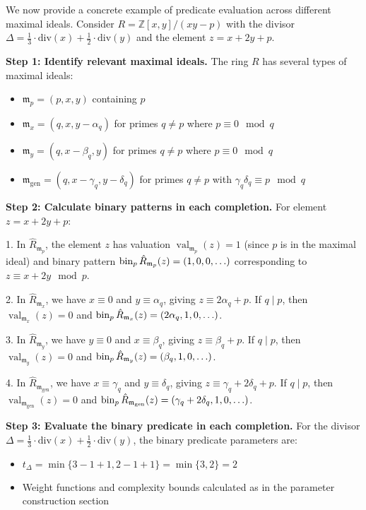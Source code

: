 \begin{example}\label{ex:predicate-across-ideals}
We now provide a concrete example of predicate evaluation across different maximal ideals. Consider $R = \mathbb{Z}[x, y]/(xy-p)$ with the divisor $\Delta = \frac{1}{3} \cdot \text{div}(x) + \frac{1}{2} \cdot \text{div}(y)$ and the element $z = x + 2y + p$.

\textbf{Step 1: Identify relevant maximal ideals.} The ring $R$ has several types of maximal ideals:
\begin{itemize}
    \item $\mathfrak{m}_p = (p, x, y)$ containing $p$
    \item $\mathfrak{m}_x = (q, x, y-\alpha_q)$ for primes $q \neq p$ where $p \equiv 0 \mod q$
    \item $\mathfrak{m}_y = (q, x-\beta_q, y)$ for primes $q \neq p$ where $p \equiv 0 \mod q$
    \item $\mathfrak{m}_{\text{gen}} = (q, x-\gamma_q, y-\delta_q)$ for primes $q \neq p$ with $\gamma_q\delta_q \equiv p \mod q$
\end{itemize}

\textbf{Step 2: Calculate binary patterns in each completion.} For element $z = x + 2y + p$:

1. In $\hat{R}_{\mathfrak{m}_p}$, the element $z$ has valuation $\operatorname{val}_{\mathfrak{m}_p}(z) = 1$ (since $p$ is in the maximal ideal) and binary pattern $\operatorname{bin}_p{\hat{R}_{\mathfrak{m}_p}}(z) = (1, 0, 0, \ldots)$ corresponding to $z \equiv x + 2y \mod p$.

2. In $\hat{R}_{\mathfrak{m}_x}$, we have $x \equiv 0$ and $y \equiv \alpha_q$, giving $z \equiv 2\alpha_q + p$. If $q \mid p$, then $\operatorname{val}_{\mathfrak{m}_x}(z) = 0$ and $\operatorname{bin}_p{\hat{R}_{\mathfrak{m}_x}}(z) = (2\alpha_q, 1, 0, \ldots)$.

3. In $\hat{R}_{\mathfrak{m}_y}$, we have $y \equiv 0$ and $x \equiv \beta_q$, giving $z \equiv \beta_q + p$. If $q \mid p$, then $\operatorname{val}_{\mathfrak{m}_y}(z) = 0$ and $\operatorname{bin}_p{\hat{R}_{\mathfrak{m}_y}}(z) = (\beta_q, 1, 0, \ldots)$.

4. In $\hat{R}_{\mathfrak{m}_{\text{gen}}}$, we have $x \equiv \gamma_q$ and $y \equiv \delta_q$, giving $z \equiv \gamma_q + 2\delta_q + p$. If $q \mid p$, then $\operatorname{val}_{\mathfrak{m}_{\text{gen}}}(z) = 0$ and $\operatorname{bin}_p{\hat{R}_{\mathfrak{m}_{\text{gen}}}}(z) = (\gamma_q + 2\delta_q, 1, 0, \ldots)$.

\textbf{Step 3: Evaluate the binary predicate in each completion.} For the divisor $\Delta = \frac{1}{3} \cdot \text{div}(x) + \frac{1}{2} \cdot \text{div}(y)$, the binary predicate parameters are:
\begin{itemize}
    \item $t_\Delta = \min\{3-1+1, 2-1+1\} = \min\{3, 2\} = 2$
    \item Weight functions and complexity bounds calculated as in the parameter construction section
\end{itemize}


\end{example}
